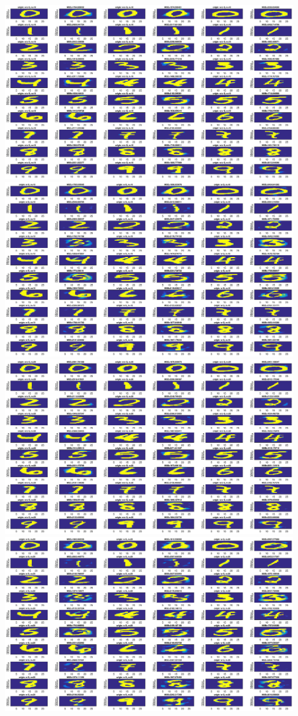 \documentclass[letterpaper,10pt]{article}
\begin{document}
\begin{enumerate}
\begin{center}
	\includegraphics[width=0.95\textwidth]{./matlab/WoG_N10.eps}
	\includegraphics[width=0.95\textwidth]{./matlab/WG_N10.eps}
	\includegraphics[width=0.95\textwidth]{./matlab/WoG_N20.eps}
	\includegraphics[width=0.95\textwidth]{./matlab/WG_N20.eps}
	\end{center}
	
\end{enumerate}
\end{document}
